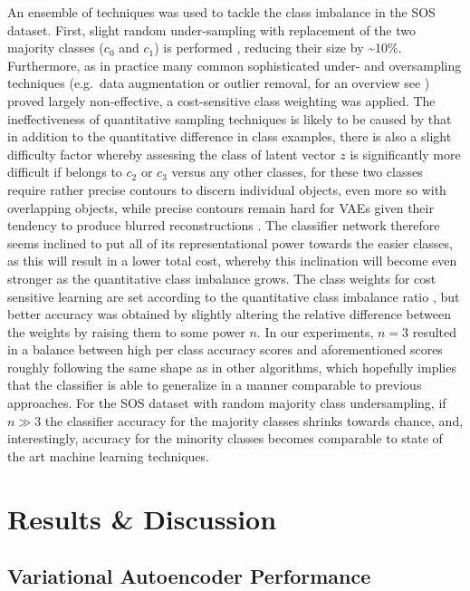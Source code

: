 \documentclass[twocolumn]{article}
\begin{document}
\noindent An ensemble of techniques was used to tackle the class imbalance in the
SOS dataset. First, slight random under-sampling with replacement of the
two majority classes (\(c_0\) and \(c_1\)) is performed
\citep[see][]{JMLR:v18:16-365}, reducing their size by
\textasciitilde{}10\%. Furthermore, as in practice many common
sophisticated under- and oversampling techniques (e.g.~data augmentation
or outlier removal, for an overview see \citet{fernandez2013}) proved
largely non-effective, a cost-sensitive class weighting was applied. The
ineffectiveness of quantitative sampling techniques is likely to be caused
by that in addition to the quantitative difference in class examples,
there is also a slight difficulty factor whereby assessing the class of
latent vector \(z\) is significantly more difficult if belongs to \(c_2\) or \(c_3\)
versus any other classes, for these two classes require rather precise
contours to discern individual objects, even more so with overlapping
objects, while precise contours remain hard for VAEs given their
tendency to produce blurred reconstructions
\citep{larsen2015autoencoding}. The classifier network therefore seems
inclined to put all of its representational power towards the easier
classes, as this will result in a lower total cost, whereby this
inclination will become even stronger as the quantitative class
imbalance grows. The class weights for cost sensitive learning are set
according to the quantitative class imbalance ratio \citep[similar to
section 3.2 in][]{fernandez2013}, but better accuracy was obtained by
slightly altering the relative difference between the weights by raising
them to some power \(n\). In our experiments, \(n=3\) resulted in a
balance between high per class accuracy scores and aforementioned scores
roughly following the same shape as in other algorithms, which hopefully
implies that the classifier is able to generalize in a manner comparable
to previous approaches. For the SOS dataset with random majority class
undersampling, if \(n \gg 3\) the classifier accuracy for the majority
classes shrinks towards chance, and, interestingly, accuracy for the
minority classes becomes comparable to state of the art machine
learning techniques.


\hypertarget{results-discussion}{%
\section{Results \& Discussion}\label{results-discussion}}

\hypertarget{variational-autoencoder-performance}{%
\subsection{Variational Autoencoder
Performance}\label{variational-autoencoder-performance}}
\end{document}
